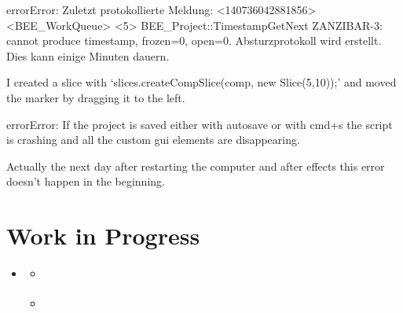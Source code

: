 \documentclass[a4paper,11pt,openany,oneside,english]{sphinxmanual}
\begin{document}
\begin{sphinxadmonition}{error}{Error:}
Zuletzt protokollierte Meldung: \textless{}140736042881856\textgreater{} \textless{}BEE\_WorkQueue\textgreater{} \textless{}5\textgreater{} BEE\_Project::TimestampGetNext ZANZIBAR-3: cannot produce timestamp, frozen=0, open=0. Absturzprotokoll wird erstellt. Dies kann einige Minuten dauern.

I created a slice with ‘slices.createCompSlice(comp, new Slice(5,10));’ and moved the marker by dragging it to the left.
\end{sphinxadmonition}

\begin{sphinxadmonition}{error}{Error:}
If the project is saved either with autosave or with cmd+s the script is crashing and all the custom gui elements are disappearing.

Actually the next day after restarting the computer and after effects this error doesn’t happen in the beginning.
\end{sphinxadmonition}


\section{Work in Progress}
\label{\detokenize{work_in_progress:work-in-progress}}\label{\detokenize{work_in_progress::doc}}
\begin{sphinxShadowBox}
\begin{itemize}
\item {} 
\label{\detokenize{work_in_progress:id1}}{\hyperref[\detokenize{work_in_progress:work-in-progress}]{}}
\begin{itemize}
\item {} 
\label{\detokenize{work_in_progress:id2}}{\hyperref[\detokenize{work_in_progress:recent-searches}]{}}

\item {} 
\label{\detokenize{work_in_progress:id3}}{\hyperref[\detokenize{work_in_progress:in-progress}]{}}

\end{itemize}

\end{itemize}
\end{sphinxShadowBox}
\end{document}
